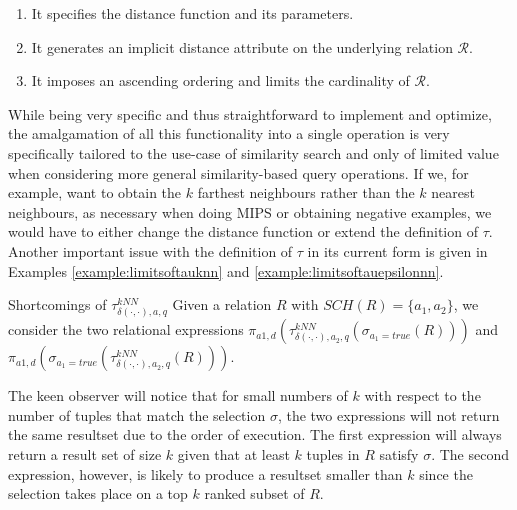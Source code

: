 \begin{enumerate}
    \item It specifies the distance function and its parameters.
    \item It generates an implicit distance attribute on the underlying relation $\mathcal{R}$.
    \item It imposes an ascending ordering and limits the cardinality of $\mathcal{R}$.
\end{enumerate}

While being very specific and thus straightforward to implement and optimize, the amalgamation of all this functionality into a single operation is very specifically tailored to the use-case of similarity search and only of limited value when considering more general similarity-based query operations. If we, for example, want to obtain the $k$ farthest neighbours rather than the $k$ nearest neighbours, as necessary when doing MIPS or obtaining negative examples, we would have to either change the distance function or extend the definition of $\tau$. Another important issue with the definition of $\tau$ in its current form is given in Examples \ref{example:limitsoftauknn} and \ref{example:limitsoftauepsilonnn}.

\begin{example}[label=example:limitsoftauknn]{Shortcomings of $\tau^{kNN}_{\delta(\cdot,\cdot),a,q}$}{}
    Given a relation $R$ with $SCH(R) = \{ a_1, a_2 \}$, we consider the two relational expressions $\pi_{a1,d}(\tau^{kNN}_{\delta(\cdot,\cdot),a_2,q}(\sigma_{a_1 = true}(R)))$ and $\pi_{a1,d}(\sigma_{a_1 = true}(\tau^{kNN}_{\delta(\cdot,\cdot),a_2,q}(R)))$. 
    
    The keen observer will notice that for small numbers of $k$ with respect to the number of tuples that match the selection $\sigma$, the two expressions will not return the same resultset due to the order of execution. The first expression will always return a result set of size $k$ given that at least $k$ tuples in $R$ satisfy $\sigma$. The second expression, however, is likely to produce a resultset smaller than $k$ since the selection takes place on a top $k$ ranked subset of $R$.
\end{example}

